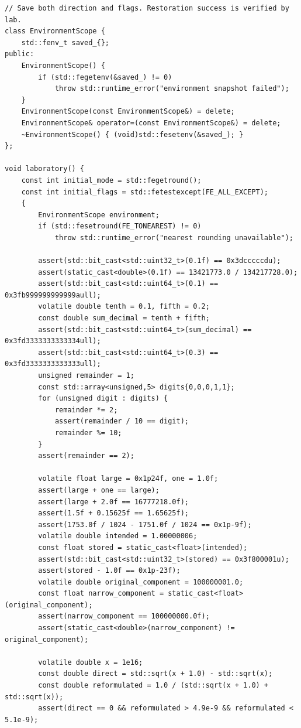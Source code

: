 \begin{verbatim}
// Save both direction and flags. Restoration success is verified by lab.
class EnvironmentScope {
    std::fenv_t saved_{};
public:
    EnvironmentScope() {
        if (std::fegetenv(&saved_) != 0)
            throw std::runtime_error("environment snapshot failed");
    }
    EnvironmentScope(const EnvironmentScope&) = delete;
    EnvironmentScope& operator=(const EnvironmentScope&) = delete;
    ~EnvironmentScope() { (void)std::fesetenv(&saved_); }
};

void laboratory() {
    const int initial_mode = std::fegetround();
    const int initial_flags = std::fetestexcept(FE_ALL_EXCEPT);
    {
        EnvironmentScope environment;
        if (std::fesetround(FE_TONEAREST) != 0)
            throw std::runtime_error("nearest rounding unavailable");

        assert(std::bit_cast<std::uint32_t>(0.1f) == 0x3dcccccdu);
        assert(static_cast<double>(0.1f) == 13421773.0 / 134217728.0);
        assert(std::bit_cast<std::uint64_t>(0.1) == 0x3fb999999999999aull);
        volatile double tenth = 0.1, fifth = 0.2;
        const double sum_decimal = tenth + fifth;
        assert(std::bit_cast<std::uint64_t>(sum_decimal) == 0x3fd3333333333334ull);
        assert(std::bit_cast<std::uint64_t>(0.3) == 0x3fd3333333333333ull);
        unsigned remainder = 1;
        const std::array<unsigned,5> digits{0,0,0,1,1};
        for (unsigned digit : digits) {
            remainder *= 2;
            assert(remainder / 10 == digit);
            remainder %= 10;
        }
        assert(remainder == 2);

        volatile float large = 0x1p24f, one = 1.0f;
        assert(large + one == large);
        assert(large + 2.0f == 16777218.0f);
        assert(1.5f + 0.15625f == 1.65625f);
        assert(1753.0f / 1024 - 1751.0f / 1024 == 0x1p-9f);
        volatile double intended = 1.00000006;
        const float stored = static_cast<float>(intended);
        assert(std::bit_cast<std::uint32_t>(stored) == 0x3f800001u);
        assert(stored - 1.0f == 0x1p-23f);
        volatile double original_component = 100000001.0;
        const float narrow_component = static_cast<float>(original_component);
        assert(narrow_component == 100000000.0f);
        assert(static_cast<double>(narrow_component) != original_component);

        volatile double x = 1e16;
        const double direct = std::sqrt(x + 1.0) - std::sqrt(x);
        const double reformulated = 1.0 / (std::sqrt(x + 1.0) + std::sqrt(x));
        assert(direct == 0 && reformulated > 4.9e-9 && reformulated < 5.1e-9);


\end{verbatim}
